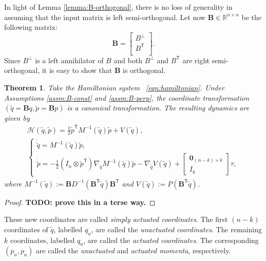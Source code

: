 \documentclass[journal,twoside,web]{ieeecolor}
\newtheorem{thm}{Theorem}%
\newcommand*{\tpose}{^\mathsf{T}}
\newcommand*{\R}{\mathbb{R}}
\newcommand*{\Minv}{M^\mathsf{-1}}
\newcommand*{\Id}[1]{I_{#1}}
\newcommand*{\Zmat}[1]{\bm{0}_{#1}}
\newcommand*{\simpleB}{\begin{bmatrix}\Zmat{(n-k)\times k}\\ \Id{k}\end{bmatrix}}
\begin{document}
In light of Lemma \ref{lemma:B-orthogonal}, there is no loss of generality in
assuming that the input matrix is left semi-orthogonal.
Let now \(\mathbf{B} \in \R^{n\times n}\) be the following matrix:
\[
    \mathbf{B} = 
    \begin{bmatrix}
        B^\perp \\
        B\tpose \\
    \end{bmatrix}
    .
\]
Since \(B^\perp\) is a left annihilator of \(B\) and both \(B^\perp\) and
\(B\tpose\) are right semi-orthogonal, it is easy to show that \(\mathbf{B}\) is
orthogonal.

\begin{thm}\label{thm:simply-actuated}
    Take the Hamiltonian system ~\eqref{eqn:hamiltonian}.
    Under Assumptions \ref{assm:B-const} and \ref{assm:B-perp},
    the coordinate transformation
    \(\left(\tilde{q} = \mathbf{B}q, \tilde{p} = \mathbf{B}p\right)\)
    is a canonical transformation.
    The resulting dynamics are given by 
    \begin{gather}\label{eqn:simple-hamiltonian}
        \mathcal{H}(\tilde{q},\tilde{p}) = 
        \frac{1}{2} \tilde{p}\tpose \Minv(\tilde{q}) \tilde{p} + V(\tilde{q})
        , \\
       \begin{cases}
           \dot{\tilde{q}} = \Minv(\tilde{q})\tilde{p}
           , \\
           \dot{\tilde{p}} = -\frac{1}{2} (\Id{n} \otimes \tilde{p}\tpose)
           \nabla_{\tilde{q}} \Minv(\tilde{q}) \tilde{p}
           - \nabla_{\tilde{q}} V(\tilde{q}) + \simpleB \tau
            ,
        \end{cases} \nonumber
    \end{gather}
    where 
    \(\Minv(\tilde{q}) := \mathbf{B}D^{-1}(\mathbf{B}\tpose
    \tilde{q})\mathbf{B}\tpose\)
    and
    \(V(\tilde{q}) := P(\mathbf{B}\tpose \tilde{q})\).
\end{thm}
\begin{proof}
    \textbf{TODO: prove this in a terse way.}
\end{proof}
These new coordinates are called \textit{simply actuated coordinates}.
The first \((n-k)\) coordinates of \(\tilde{q}\), labelled \(q_u\), are called
the \textit{unactuated coordinates}. 
The remaining \(k\) coordinates, labelled \(q_a\), are called the
\textit{actuated coordinates}.
The corresponding \((p_u, p_a)\) are called the \textit{unactuated} and 
\textit{actuated momenta}, respectively.
\end{document}
